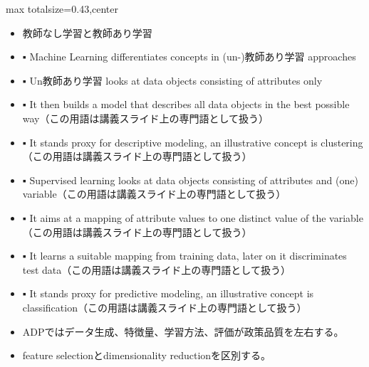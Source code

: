 \clearpage
{}
\begin{minipage}[t]{0.405\textwidth}
\begin{adjustbox}{max totalsize={\textwidth}{0.43\textheight},center}
\begin{minipage}{\textwidth}\scriptsize
{}\begin{itemize}
\item 教師なし学習と教師あり学習
\item ▪ Machine Learning differentiates concepts in (un-)教師あり学習 approaches
\item ▪ Un教師あり学習 looks at data objects consisting of attributes only
\item ▪ It then builds a model that describes all data objects in the best possible way（この用語は講義スライド上の専門語として扱う）
\item ▪ It stands proxy for descriptive modeling, an illustrative concept is clustering（この用語は講義スライド上の専門語として扱う）
\item ▪ Supervised learning looks at data objects consisting of attributes and (one) variable（この用語は講義スライド上の専門語として扱う）
\item ▪ It aims at a mapping of attribute values to one distinct value of the variable（この用語は講義スライド上の専門語として扱う）
\item ▪ It learns a suitable mapping from training data, later on it discriminates test data（この用語は講義スライド上の専門語として扱う）
\item ▪ It stands proxy for predictive modeling, an illustrative concept is classification（この用語は講義スライド上の専門語として扱う）
\end{itemize}\begin{itemize}
\item ADPではデータ生成、特徴量、学習方法、評価が政策品質を左右する。
\item feature selectionとdimensionality reductionを区別する。
\end{itemize}
\end{minipage}
\end{adjustbox}
\end{minipage}\hfill
